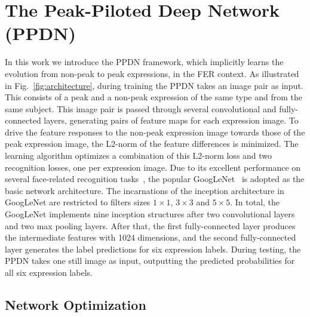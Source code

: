 \documentclass[runningheads]{llncs}
\begin{document}
\section{The Peak-Piloted Deep Network (PPDN)}


In this work we introduce the PPDN framework, which implicitly learns 
the evolution from non-peak to peak expressions, in
the FER context. As illustrated in 
Fig.~\ref{fig:architecture}, during training the PPDN takes an image pair as 
input. This consists of a peak and a non-peak expression of the same 
type and from the same subject. This image pair is passed through several 
convolutional and fully-connected layers, generating pairs of feature 
maps for each expression image. To drive the feature responses to the 
non-peak expression image towards those of the peak expression image, the 
L2-norm of the feature differences is minimized. 
The learning algorithm optimizes a combination of this L2-norm loss
and two recognition losses, one per expression image. 
Due to its excellent performance on several face-related recognition 
tasks~\cite{schroff2015facenet,sun2015deepid3}, the popular 
GoogLeNet~\cite{szegedy2015going} is adopted as the basic 
network architecture. The incarnations of the inception architecture in 
GoogLeNet are restricted to filters sizes $1 \times 1$, $3 \times 3$ and 
$5 \times 5$. In total, the GoogLeNet implements nine inception structures 
after two convolutional layers and two max pooling layers. After that, the 
first fully-connected layer produces the intermediate features with 1024 
dimensions, and the second fully-connected layer generates the label 
predictions for six expression labels. During testing, the PPDN takes one 
still image as input, outputting the predicted probabilities for all six 
expression labels. 




\subsection{Network Optimization}
\end{document}
